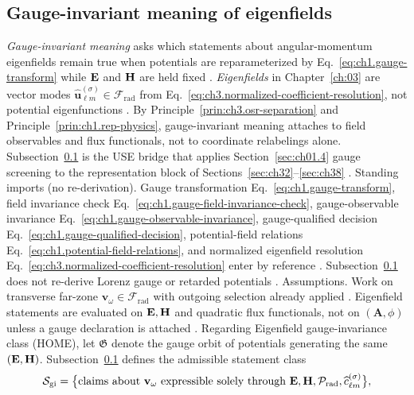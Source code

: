 \subsection{Gauge-invariant meaning of eigenfields}
\label{sec:ch391}
\emph{Gauge-invariant meaning} asks which statements about angular-momentum eigenfields remain true when potentials are
reparameterized by Eq.~\eqref{eq:ch1.gauge-transform} while \(\mathbf{E}\) and \(\mathbf{H}\) are held fixed
\cite{belinfante1940}. \emph{Eigenfields} in Chapter~\ref{ch:03} are vector modes
\(\widehat{\mathbf{u}}_{\ell m}^{(\sigma)}\in\mathcal{F}_{\mathrm{rad}}\) from Eq.~\eqref{eq:ch3.normalized-coefficient-resolution},
not potential eigenfunctions \cite{hansen1988}. By Principle~\ref{prin:ch3.osr-separation} and
Principle~\ref{prin:ch1.rep-physics}, gauge-invariant meaning attaches to field observables and flux functionals,
not to coordinate relabelings alone. Subsection~\ref{sec:ch391} is the USE bridge that applies
Section~\ref{sec:ch01.4} gauge screening to the representation block of Sections~\ref{sec:ch32}--\ref{sec:ch38}
\cite{belinfante1940}.
Standing imports (no re-derivation). Gauge transformation Eq.~\eqref{eq:ch1.gauge-transform}, field invariance check Eq.~\eqref{eq:ch1.gauge-field-invariance-check},
gauge-observable invariance Eq.~\eqref{eq:ch1.gauge-observable-invariance}, gauge-qualified decision
Eq.~\eqref{eq:ch1.gauge-qualified-decision}, potential-field relations Eq.~\eqref{eq:ch1.potential-field-relations}, and
normalized eigenfield resolution Eq.~\eqref{eq:ch3.normalized-coefficient-resolution} enter by reference
\cite{stratton1941}. Subsection~\ref{sec:ch391} does not re-derive Lorenz gauge or retarded potentials
\cite{stratton1941}.
Assumptions. Work on transverse far-zone \(\mathbf{v}_\omega\in\mathcal{F}_{\mathrm{rad}}\) with outgoing selection already applied
\cite{harrington2001}. Eigenfield statements are evaluated on \(\mathbf{E},\mathbf{H}\) and quadratic flux functionals, not on
\((\mathbf{A},\phi)\) unless a gauge declaration is attached \cite{belinfante1940}.
Regarding Eigenfield gauge-invariance class (HOME), let \(\mathfrak{G}\) denote the gauge orbit of potentials generating the same \((\mathbf{E},\mathbf{H})\). Subsection~\ref{sec:ch391} defines the
admissible statement class
\begin{equation}
\label{eq:ch3.eigenfield-gauge-invariance-class}
\mathcal{S}_{\mathrm{gi}}
=
\bigl\{\text{claims about }\mathbf{v}_\omega\text{ expressible solely through }
\mathbf{E},\mathbf{H},\mathcal{P}_{\mathrm{rad}},\widehat{c}_{\ell m}^{(\sigma)}\bigr\},
\end{equation}
